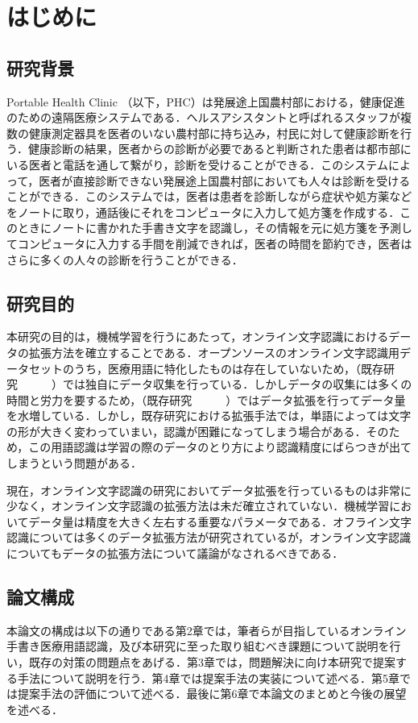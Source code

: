 
\chapter{はじめに}
\label{cha:intro}
\section{研究背景}
\label{sec:background}
Portable Health Clinic （以下，PHC）は発展途上国農村部における，健康促進のための遠隔医療システムである\cite{ahmed15:portable}．ヘルスアシスタントと呼ばれるスタッフが複数の健康測定器具を医者のいない農村部に持ち込み，村民に対して健康診断を行う．健康診断の結果，医者からの診断が必要であると判断された患者は都市部にいる医者と電話を通して繋がり，診断を受けることができる．このシステムによって，医者が直接診断できない発展途上国農村部においても人々は診断を受けることができる．このシステムでは，医者は患者を診断しながら症状や処方薬などをノートに取り，通話後にそれをコンピュータに入力して処方箋を作成する．このときにノートに書かれた手書き文字を認識し，その情報を元に処方箋を予測してコンピュータに入力する手間を削減できれば，医者の時間を節約でき，医者はさらに多くの人々の診断を行うことができる．

\section{研究目的}
本研究の目的は，機械学習を行うにあたって，オンライン文字認識におけるデータの拡張方法を確立することである．オープンソースのオンライン文字認識用データセットのうち，医療用語に特化したものは存在していないため，（既存研究　　　）では独自にデータ収集を行っている．しかしデータの収集には多くの時間と労力を要するため，（既存研究　　　）ではデータ拡張を行ってデータ量を水増している．しかし，既存研究における拡張手法では，単語によっては文字の形が大きく変わっていまい，認識が困難になってしまう場合がある．そのため，この用語認識は学習の際のデータのとり方により認識精度にばらつきが出てしまうという問題がある．


現在，オンライン文字認識の研究においてデータ拡張を行っているものは非常に少なく，オンライン文字認識の拡張方法は未だ確立されていない．機械学習においてデータ量は精度を大きく左右する重要なパラメータである．オフライン文字認識については多くのデータ拡張方法が研究されているが，オンライン文字認識についてもデータの拡張方法について議論がなされるべきである．


\section{論文構成}
本論文の構成は以下の通りである第2章では，筆者らが目指しているオンライン手書き医療用語認識，及び本研究に至った取り組むべき課題について説明を行い，既存の対策の問題点をあげる．第3章では，問題解決に向け本研究で提案する手法について説明を行う．第4章では提案手法の実装について述べる．第5章では提案手法の評価について述べる．最後に第6章で本論文のまとめと今後の展望を述べる．
